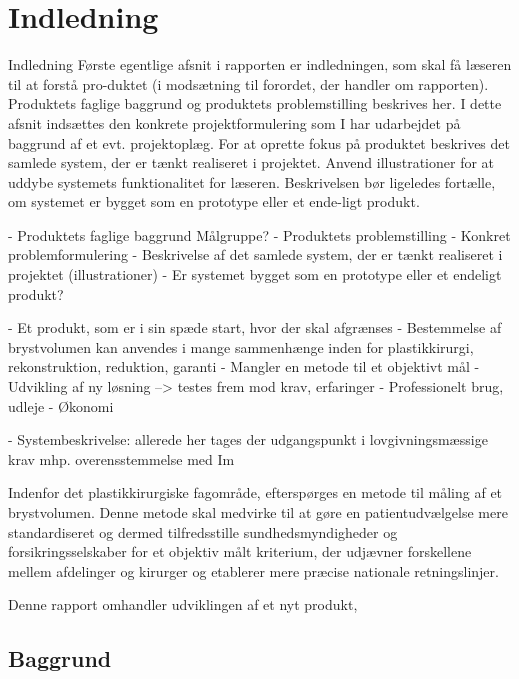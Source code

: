 \chapter{Indledning}

Indledning
Første egentlige afsnit i rapporten er indledningen, som skal få læseren til at forstå pro-duktet (i modsætning til forordet, der handler om rapporten). Produktets faglige baggrund og produktets problemstilling beskrives her.
I dette afsnit indsættes den konkrete projektformulering som I har udarbejdet på baggrund af et evt. projektoplæg.
For at oprette fokus på produktet beskrives det samlede system, der er tænkt realiseret i projektet. Anvend illustrationer for at uddybe systemets funktionalitet for læseren.
Beskrivelsen bør ligeledes fortælle, om systemet er bygget som en prototype eller et ende-ligt produkt.


- Produktets faglige baggrund 
	Målgruppe? 
- Produktets problemstilling
- Konkret problemformulering
- Beskrivelse af det samlede system, der er tænkt realiseret i projektet (illustrationer)
- Er systemet bygget som en prototype eller et endeligt produkt? 


- Et produkt, som er i sin spæde start, hvor der skal afgrænses
- Bestemmelse af brystvolumen kan anvendes i mange sammenhænge inden for plastikkirurgi, rekonstruktion, reduktion, garanti  
- Mangler en metode til et objektivt mål   
- Udvikling af ny løsning --> testes frem mod krav, erfaringer 
- Professionelt brug, udleje 
- Økonomi 


- Systembeskrivelse: allerede her tages der udgangspunkt i lovgivningsmæssige krav mhp. overensstemmelse med Im 

 

Indenfor det plastikkirurgiske fagområde, efterspørges en metode til måling af et brystvolumen. Denne metode skal medvirke til at gøre en patientudvælgelse mere standardiseret og dermed tilfredsstille sundhedsmyndigheder og forsikringsselskaber for et objektiv målt kriterium, der udjævner forskellene mellem afdelinger og kirurger og etablerer mere præcise nationale retningslinjer. 

Denne rapport omhandler udviklingen af et nyt produkt, 






\section{Baggrund}



